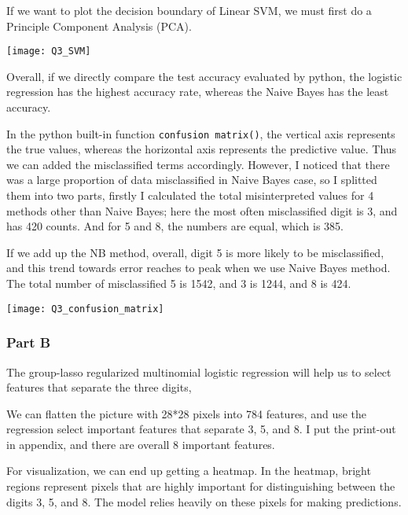 \documentclass[letterpaper]{article}
\begin{document}
If we want to plot the decision boundary of Linear SVM, we must first do a Principle Component Analysis (PCA).

 \begin{center}
	\texttt{[image: Q3\_SVM]}
\end{center}

Overall, if we directly compare the test accuracy evaluated by python, the logistic regression has the highest accuracy rate, whereas the Naive Bayes has the least accuracy.

In the python built-in function \texttt{confusion matrix()}, the vertical axis represents the true values, whereas the horizontal axis represents the predictive value. Thus we can added the misclassified terms accordingly. However, I noticed that there was a large proportion of data misclassified in Naive Bayes case, so I splitted them into two parts, firstly I calculated the total misinterpreted values for 4 methods other than Naive Bayes; here the most often misclassified digit is 3, and has 420 counts. And for 5 and 8, the numbers are equal, which is 385. 

If we add up the NB method, overall, digit 5 is more likely to be misclassified, and this trend towards error reaches to peak when we use Naive Bayes method. The total number of misclassified 5 is 1542, and 3 is 1244, and 8 is 424.

 \begin{center}
	\texttt{[image: Q3\_confusion\_matrix]}
\end{center}

		\subsubsection{Part B}
		
		The group-lasso regularized multinomial logistic regression will help us to select features that separate the three digits, 
		
		We can flatten the picture with 28*28 pixels into 784 features, and use the regression select important features that separate 3, 5, and 8. I put the print-out in appendix, and there are overall 8 important features. 
		
		For visualization, we can end up getting a heatmap. In the heatmap, bright regions represent pixels that are highly important for distinguishing between the digits 3, 5, and 8. The model relies heavily on these pixels for making predictions.
		
\end{document}
